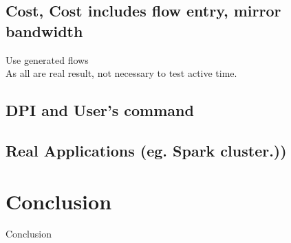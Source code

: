 \documentclass{acm_proc_article-sp}
\begin{document}
\subsection{Cost, Cost includes flow entry, mirror bandwidth}
Use generated flows\\
As all are real result, not necessary to test active time.

\subsection{DPI and User's command}

\subsection{Real Applications (eg. Spark cluster.))}


\section{Conclusion}
Conclusion\\




\end{document}
